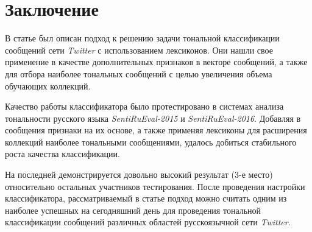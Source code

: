 \section*{Заключение}
В статье был описан подход к решению задачи тональной классификации сообщений
сети {\it Twitter} с использованием лексиконов.
Они нашли свое применение в качестве дополнительных признаков в векторе
сообщений, а также для отбора наиболее тональных сообщений с целью увеличения
объема обучающих коллекций.

Качество работы классификатора было протестировано в системах анализа тональности
русского языка {\it SentiRuEval-2015} и {\it SentiRuEval-2016}.
Добавляя в сообщения признаки на их основе, а также применяя лексиконы
для расширения коллекций наиболее тональными сообщениями, удалось добиться
стабильного роста качества классификации.

На последней демонстрируется довольно высокий результат (3-е место) относительно
остальных участников тестирования.
После проведения настройки классификатора, рассматриваемый в статье подход
можно считать одним из наиболее успешных на сегодняшний день для проведения
тональной классификации сообщений различных областей русскоязычной сети
{\it Twitter}.
